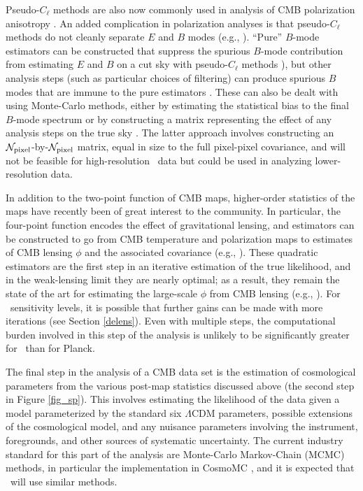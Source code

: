 Pseudo-$C_\ell$ methods are also now commonly used in analysis of CMB polarization anisotropy
\cite{Aghanim:2015xee,Naess:2014wtr,Crites:2014prc}. An added complication in polarization analyses is that 
pseudo-$C_\ell$ methods do not cleanly separate $E$ and $B$ modes (e.g., \cite{Challinor:2005jy}).
``Pure'' $B$-mode estimators can be constructed that suppress the spurious $B$-mode contribution
from estimating $E$ and $B$ on a cut sky with pseudo-$C_\ell$ methods \cite{Smith:2005gi}), but 
other analysis steps (such as particular choices of filtering) can produce spurious $B$ modes that
are immune to the pure estimators \cite{Keisler:2015hfa}. These can also be dealt with using Monte-Carlo
methods, either by estimating the statistical bias to the final $B$-mode spectrum or by constructing
a matrix representing the effect of any analysis steps on the true sky \cite{Ade:2014xna}. The latter
approach involves constructing an ${\cal N}_\mathrm{pixel}$-by-${\cal N}_\mathrm{pixel}$ matrix, equal in size to the 
full pixel-pixel covariance, and will not be feasible for high-resolution \cmbexp\ data but could be 
used in analyzing lower-resolution data.

In addition to the two-point function of CMB maps, higher-order statistics of the maps have recently 
been of great interest to the community. In particular, the four-point function encodes the effect of 
gravitational lensing, and estimators can be constructed to go from CMB temperature and polarization
maps to estimates of CMB lensing $\phi$ and the associated covariance (e.g., \cite{Hu:2001kj,Okamoto:2003zw}).
These quadratic estimators are the first step in an iterative estimation of the true likelihood, and in
the weak-lensing limit they are nearly optimal; as a result, they remain the state of the art for estimating
the large-scale $\phi$ from CMB lensing (e.g., \cite{Ade:2013lta}). For \cmbexp\ sensitivity levels, 
it is possible that further gains can be made with more iterations (see Section \ref{delens}).
Even with multiple steps, the computational burden involved
in this step of the analysis is unlikely to be significantly greater for \cmbexp\ than for Planck.

The final step in the analysis of a CMB data set is the estimation of cosmological parameters from
the various post-map statistics discussed above (the second step in Figure \ref{fig_sp}). This involves estimating the likelihood of the data
given a model parameterized by the standard six $\Lambda$CDM parameters, possible extensions
of the cosmological model, and any nuisance parameters involving the instrument, foregrounds, and
other sources of systematic uncertainty. The current industry standard for this part of the analysis are
Monte-Carlo Markov-Chain (MCMC) methods, in particular the implementation in CosmoMC
\cite{Lewis:2002ah}, and it is expected that \cmbexp\ will use similar methods. 

